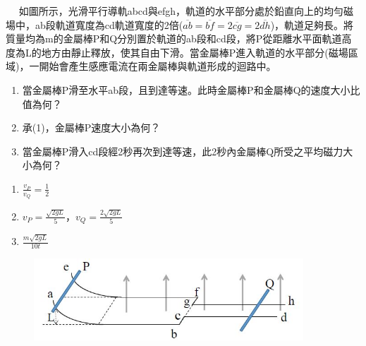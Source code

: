 \documentclass[cn,10pt,math=newtx,chinesefont=founder]{elegantbook}
\begin{document}
\begin{example}　
    如圖所示，光滑平行導軌abcd與efgh，軌道的水平部分處於鉛直向上的均勻磁場中，ab段軌道寬度為cd軌道寬度的2倍($\overline{ab}=\overline{bf}=2\overline{cg}=2\overline{dh}$)，軌道足夠長。將質量均為m的金屬棒P和Q分別置於軌道的ab段和cd段，將P從距離水平面軌道高度為L的地方由靜止釋放，使其自由下滑。當金屬棒P進入軌道的水平部分(磁場區域)，一開始會產生感應電流在兩金屬棒與軌道形成的迴路中。
    \begin{enumerate}[label=(\arabic*)]
    \item 當金屬棒P滑至水平ab段，且到達等速。此時金屬棒P和金屬棒Q的速度大小比值為何？
    \item 承(1)，金屬棒P速度大小為何？
    \item 當金屬棒P滑入cd段經2秒再次到達等速，此2秒內金屬棒Q所受之平均磁力大小為何？
    \end{enumerate}
    
    \rightline{[2]}
\end{example}

\begin{solution}
\begin{enumerate}[label=(\arabic*)]
\item $\frac{v_P}{v_Q}=\frac{1}{2}$
\item $v_P=\frac{\sqrt{2gL}}{5}$，$v_Q=\frac{2\sqrt{2gL}}{5}$
\item $\frac{m\sqrt{2gL}}{10t}$
\end{enumerate}
\end{solution}

\begin{figure}[htbp]
\flushright
\includegraphics[width=0.9\textwidth]{image/222.JPG}
\end{figure}

\newpage
\end{document}
